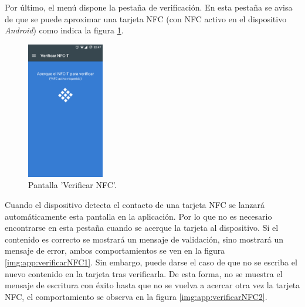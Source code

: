 \documentclass[../PFC.tex]{subfiles}
\begin{document}
Por último, el menú dispone la pestaña de verificación. En esta pestaña se avisa de que se puede aproximar una tarjeta NFC (con NFC activo en el dispositivo \textit{Android}) como indica la figura \ref{img:app:verificarNFC}.

\begin{figure}[H]
  \centering
  \includegraphics[width=0.3\textwidth]{./img/app/verificarNFC}
  \caption{Pantalla 'Verificar NFC'.}
  \label{img:app:verificarNFC}
\end{figure}  

Cuando el dispositivo detecta el contacto de una tarjeta NFC se lanzará automáticamente esta pantalla en la aplicación. Por lo que no es necesario encontrarse en esta pestaña cuando se acerque la tarjeta al dispositivo. Si el contenido es correcto se mostrará un mensaje de validación, sino mostrará un mensaje de error, ambos comportamientos se ven en la figura \ref{img:app:verificarNFC1}. Sin embargo, puede darse el caso de que no se escriba el nuevo contenido en la tarjeta tras verificarla. De esta forma, no se muestra el mensaje de escritura con éxito hasta que no se vuelva a acercar otra vez la tarjeta NFC, el comportamiento se observa en la figura \ref{img:app:verificarNFC2}.
\end{document}
